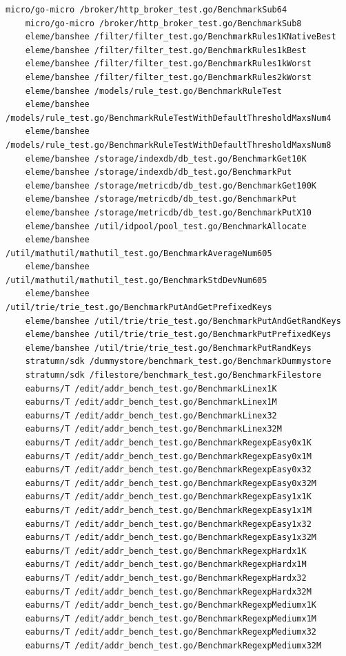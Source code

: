 \documentclass{seal_thesis}
\begin{document}
\begin{lstlisting}[basicstyle=\tiny]
	micro/go-micro /broker/http_broker_test.go/BenchmarkSub64
	micro/go-micro /broker/http_broker_test.go/BenchmarkSub8
	eleme/banshee /filter/filter_test.go/BenchmarkRules1KNativeBest
	eleme/banshee /filter/filter_test.go/BenchmarkRules1kBest
	eleme/banshee /filter/filter_test.go/BenchmarkRules1kWorst
	eleme/banshee /filter/filter_test.go/BenchmarkRules2kWorst
	eleme/banshee /models/rule_test.go/BenchmarkRuleTest
	eleme/banshee /models/rule_test.go/BenchmarkRuleTestWithDefaultThresholdMaxsNum4
	eleme/banshee /models/rule_test.go/BenchmarkRuleTestWithDefaultThresholdMaxsNum8
	eleme/banshee /storage/indexdb/db_test.go/BenchmarkGet10K
	eleme/banshee /storage/indexdb/db_test.go/BenchmarkPut
	eleme/banshee /storage/metricdb/db_test.go/BenchmarkGet100K
	eleme/banshee /storage/metricdb/db_test.go/BenchmarkPut
	eleme/banshee /storage/metricdb/db_test.go/BenchmarkPutX10
	eleme/banshee /util/idpool/pool_test.go/BenchmarkAllocate
	eleme/banshee /util/mathutil/mathutil_test.go/BenchmarkAverageNum605
	eleme/banshee /util/mathutil/mathutil_test.go/BenchmarkStdDevNum605
	eleme/banshee /util/trie/trie_test.go/BenchmarkPutAndGetPrefixedKeys
	eleme/banshee /util/trie/trie_test.go/BenchmarkPutAndGetRandKeys
	eleme/banshee /util/trie/trie_test.go/BenchmarkPutPrefixedKeys
	eleme/banshee /util/trie/trie_test.go/BenchmarkPutRandKeys
	stratumn/sdk /dummystore/benchmark_test.go/BenchmarkDummystore
	stratumn/sdk /filestore/benchmark_test.go/BenchmarkFilestore
	eaburns/T /edit/addr_bench_test.go/BenchmarkLinex1K
	eaburns/T /edit/addr_bench_test.go/BenchmarkLinex1M
	eaburns/T /edit/addr_bench_test.go/BenchmarkLinex32
	eaburns/T /edit/addr_bench_test.go/BenchmarkLinex32M
	eaburns/T /edit/addr_bench_test.go/BenchmarkRegexpEasy0x1K
	eaburns/T /edit/addr_bench_test.go/BenchmarkRegexpEasy0x1M
	eaburns/T /edit/addr_bench_test.go/BenchmarkRegexpEasy0x32
	eaburns/T /edit/addr_bench_test.go/BenchmarkRegexpEasy0x32M
	eaburns/T /edit/addr_bench_test.go/BenchmarkRegexpEasy1x1K
	eaburns/T /edit/addr_bench_test.go/BenchmarkRegexpEasy1x1M
	eaburns/T /edit/addr_bench_test.go/BenchmarkRegexpEasy1x32
	eaburns/T /edit/addr_bench_test.go/BenchmarkRegexpEasy1x32M
	eaburns/T /edit/addr_bench_test.go/BenchmarkRegexpHardx1K
	eaburns/T /edit/addr_bench_test.go/BenchmarkRegexpHardx1M
	eaburns/T /edit/addr_bench_test.go/BenchmarkRegexpHardx32
	eaburns/T /edit/addr_bench_test.go/BenchmarkRegexpHardx32M
	eaburns/T /edit/addr_bench_test.go/BenchmarkRegexpMediumx1K
	eaburns/T /edit/addr_bench_test.go/BenchmarkRegexpMediumx1M
	eaburns/T /edit/addr_bench_test.go/BenchmarkRegexpMediumx32
	eaburns/T /edit/addr_bench_test.go/BenchmarkRegexpMediumx32M

\end{lstlisting}
\end{document}
